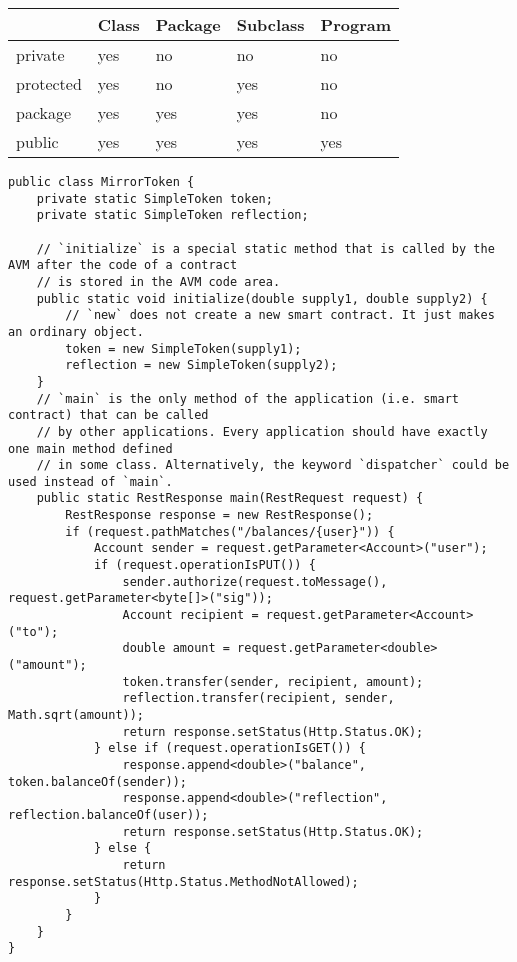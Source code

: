 \begin{center}
    \begin{tabular}{lllll}
        \hline
        & Class & Package & Subclass & Program \\
        \hline
        private   & yes   & no      & no       & no  \\
        protected & yes   & no      & yes      & no  \\
        package   & yes   & yes     & yes      & no  \\
        public    & yes   & yes     & yes      & yes \\
        \hline
    \end{tabular}\label{tab:table}
\end{center}


\begin{lstlisting}[frame=TB, float, title=A simple Argon application,label={lst:code1}]
public class MirrorToken {
    private static SimpleToken token;
    private static SimpleToken reflection;

    // `initialize` is a special static method that is called by the AVM after the code of a contract
    // is stored in the AVM code area.
    public static void initialize(double supply1, double supply2) {
        // `new` does not create a new smart contract. It just makes an ordinary object.
        token = new SimpleToken(supply1);
        reflection = new SimpleToken(supply2);
    }
    // `main` is the only method of the application (i.e. smart contract) that can be called
    // by other applications. Every application should have exactly one main method defined
    // in some class. Alternatively, the keyword `dispatcher` could be used instead of `main`.
    public static RestResponse main(RestRequest request) {
        RestResponse response = new RestResponse();
        if (request.pathMatches("/balances/{user}")) {
            Account sender = request.getParameter<Account>("user");
            if (request.operationIsPUT()) {
                sender.authorize(request.toMessage(), request.getParameter<byte[]>("sig"));
                Account recipient = request.getParameter<Account>("to");
                double amount = request.getParameter<double>("amount");
                token.transfer(sender, recipient, amount);
                reflection.transfer(recipient, sender, Math.sqrt(amount));
                return response.setStatus(Http.Status.OK);
            } else if (request.operationIsGET()) {
                response.append<double>("balance", token.balanceOf(sender));
                response.append<double>("reflection", reflection.balanceOf(user));
                return response.setStatus(Http.Status.OK);
            } else {
                return response.setStatus(Http.Status.MethodNotAllowed);
            }
        }
    }
}


\end{lstlisting}
